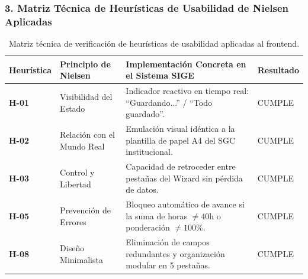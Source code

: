 \documentclass[12pt,a4paper]{article}
\begin{document}
\subsubsection*{3. Matriz Técnica de Heurísticas de Usabilidad de Nielsen Aplicadas}
\begin{table}[H]
\centering
\small
\renewcommand{\arraystretch}{1.2}
\begin{tabularx}{\textwidth}{|>{\hsize=0.6\hsize\centering\arraybackslash\bfseries\footnotesize}X|>{\hsize=1.1\hsize\raggedright\arraybackslash\footnotesize}X|>{\hsize=1.7\hsize\raggedright\arraybackslash\footnotesize}X|>{\hsize=0.6\hsize\centering\arraybackslash\footnotesize}X|}
\hline
\rowcolor{tableheader}
\textbf{Heurística} & \textbf{Principio de Nielsen} & \textbf{Implementación Concreta en el Sistema SIGE} & \textbf{Resultado} \\
\hline
H-01 & Visibilidad del Estado & Indicador reactivo en tiempo real: ``Guardando...'' / ``Todo guardado''. & CUMPLE \\
\hline
H-02 & Relación con el Mundo Real & Emulación visual idéntica a la plantilla de papel A4 del SGC institucional. & CUMPLE \\
\hline
H-03 & Control y Libertad & Capacidad de retroceder entre pestañas del Wizard sin pérdida de datos. & CUMPLE \\
\hline
H-05 & Prevención de Errores & Bloqueo automático de avance si la suma de horas $\ne 40$h o ponderación $\ne 100\%$. & CUMPLE \\
\hline
H-08 & Diseño Minimalista & Eliminación de campos redundantes y organización modular en 5 pestañas. & CUMPLE \\
\hline
\end{tabularx}
\caption{Matriz técnica de verificación de heurísticas de usabilidad aplicadas al frontend.}
\end{table}
\end{document}
